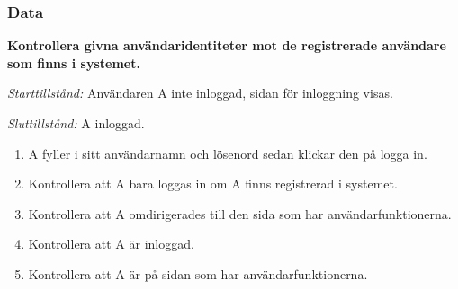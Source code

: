 \documentclass[a4paper]{article}
\begin{document}
\subsubsection{Data}
\begin{FT}
\item
\textbf{Kontrollera givna användaridentiteter mot de registrerade användare som finns i systemet.}

\emph{Starttillstånd:} Användaren A inte inloggad, sidan för inloggning visas.

\emph{Sluttillstånd:} A inloggad.

\begin{enumerate}
\item A fyller i sitt användarnamn och lösenord sedan klickar den på logga in.
\item Kontrollera att A bara loggas in om A finns registrerad i systemet.
\item Kontrollera att A omdirigerades till den sida som har användarfunktionerna.
\item Kontrollera att A är inloggad.
\item Kontrollera att A är på sidan som har användarfunktionerna.
\end{enumerate}
\end{FT}
\end{document}
